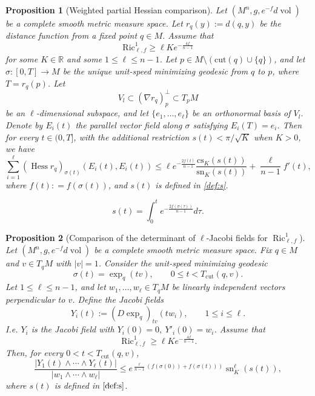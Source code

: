 \documentclass[10pt,a4paper]{amsart}
\newtheorem{prop}{Proposition}
\begin{document}
        \begin{prop}[Weighted partial Hessian comparison]\label{prop-weighted hessian}
        Let $(M^n,g,e^{-f}d\operatorname{vol})$ be a complete smooth metric measure space.
        Let
        $r_q(y):=d(q,y)$ be the distance function from a fixed point $q \in M$.
        Assume that
        \begin{equation}\label{Curvature-assumption}
        \mathrm{Ric}_{\ell,f}^1 \geq \ell K e^{-\frac{4f}{n-1}}
        \end{equation}
        for some $ K \in \mathbb{R}$ and some $1\leq \ell\leq n-1$.
        Let $p \in M \setminus (\mathrm{cut}(q)\cup \{q\})$, and let $\sigma:[0,T] \to M$ be the unique unit-speed minimizing geodesic from $q$ to $p$, where $T = r_q(p)$. Let $$V_l \subset (\nabla r_q)_{p}^\perp \subset T_p M$$ be an $\ell$-dimensional subspace, and let $\{e_1, \ldots, e_\ell\}$ be an orthonormal basis of $V_l$. Denote by $E_i(t)$ the parallel vector field along $\sigma$ satisfying $E_i(T) = e_i$.
        Then for every $t \in (0,T]$, with the additional restriction
        $s(t)< \pi / \sqrt{K}$ when $K>0$, 
        we have
        $$\sum_{i=1}^\ell (\operatorname{Hess} r_q)_{\sigma(t)}(E_i(t), E_i(t)) \leq \ell e^{-\frac{2f(t)}{n-1}} \frac{\mathrm{cs}_K(s(t))}{\mathrm{sn}_K(s(t))} + \frac{\ell}{n-1} f'(t),$$
        where $f(t) : = f(\sigma(t))$, and $s(t)$ is defined in \eqref{def:s}.
        \end{prop}

\begin{equation}\label{def:s}
    s(t) = \int_0^{t} e^{-\frac{2f(\sigma(\tau))}{n-1}}d \tau.
\end{equation}

\begin{prop}[Comparison of the determinant of $\ell$-Jacobi fields for $\operatorname{Ric}^{1}_{\ell,f}$]
    \label{lem:weighted-bishop-jacobi}
Let $(M^n,g,e^{-f}d\operatorname{vol})$ be a complete smooth metric measure space.
Fix $q \in M$ and $v \in T_qM$ with $|v| =1$. Consider the unit-speed minimizing geodesic
$$
    \sigma(t)=\exp_q(tv),\qquad 0 \leq t < T_{\mathrm{cut}}(q,v).
$$
Let $1\leq \ell\leq n-1$, and let
$w_1,\ldots,w_\ell\in T_qM$ be linearly independent vectors perpendicular to $v$.
Define the Jacobi fields
$$
    Y_i(t):=(D\exp_q)_{tv}(t w_i),\qquad 1\leq i\leq \ell .
$$
I.e. $Y_i$ is the Jacobi field with $Y_i(0) =0, \ Y'_i(0) = w_i$. 
Assume that
$$
    \operatorname{Ric}^{1}_{\ell,f}
    \geq
    \ell K e^{-\frac{4f}{n-1}}.
$$
Then, for every $0<t< T_{\mathrm{cut}}(q,v)$,
$$
\frac{|Y_1(t)\wedge\cdots\wedge Y_\ell(t)|}
{|w_1\wedge\cdots\wedge w_\ell|}
\leq
e^{\frac{\ell}{n-1}\left(f(\sigma(0))+f(\sigma(t))\right)}
\operatorname{sn}_K^\ell(s(t)) ,
$$
where $s(t)$ is defined in $\eqref{def:s}$.
\end{prop}
\end{document}
